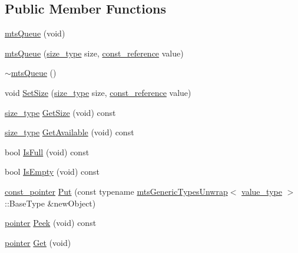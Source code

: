 \subsection*{Public Member Functions}
\begin{DoxyCompactItemize}
\item 
\hyperlink{classmts_queue_ad2d912c1cda4d077291d9b95fc4272e3}{mts\+Queue} (void)
\item 
\hyperlink{classmts_queue_adacea56ce5d53bee10e50c47ade45140}{mts\+Queue} (\hyperlink{classmts_queue_a41b33537b89ae654421ba5e7c9893ed2}{size\+\_\+type} size, \hyperlink{classmts_queue_a3ae67f8b6cdb9686e5fca9ed1740290e}{const\+\_\+reference} value)
\item 
\hyperlink{classmts_queue_a0278e7a778a29113976eb23cb21b8791}{$\sim$mts\+Queue} ()
\item 
void \hyperlink{classmts_queue_ad273e5adfc7842ee91c329d533ebeac6}{Set\+Size} (\hyperlink{classmts_queue_a41b33537b89ae654421ba5e7c9893ed2}{size\+\_\+type} size, \hyperlink{classmts_queue_a3ae67f8b6cdb9686e5fca9ed1740290e}{const\+\_\+reference} value)
\item 
\hyperlink{classmts_queue_a41b33537b89ae654421ba5e7c9893ed2}{size\+\_\+type} \hyperlink{classmts_queue_abac749440695cd9b716928a32de068fd}{Get\+Size} (void) const 
\item 
\hyperlink{classmts_queue_a41b33537b89ae654421ba5e7c9893ed2}{size\+\_\+type} \hyperlink{classmts_queue_aa33751fddc4d9f95d93985feb4322659}{Get\+Available} (void) const 
\item 
bool \hyperlink{classmts_queue_a26f919b9a57cd8f07de077ea9b9b3af5}{Is\+Full} (void) const 
\item 
bool \hyperlink{classmts_queue_a20a006bdb4a95beca2c4dd1104c9bfbf}{Is\+Empty} (void) const 
\item 
\hyperlink{classmts_queue_a1224d9a0146fab27bdb1db050288acb4}{const\+\_\+pointer} \hyperlink{classmts_queue_abb9c17c7303935d91b0be7cd1e790e2f}{Put} (const typename \hyperlink{classmts_generic_types_unwrap}{mts\+Generic\+Types\+Unwrap}$<$ \hyperlink{classmts_queue_a041a2b244150e58247ee55039e0bb00f}{value\+\_\+type} $>$\+::Base\+Type \&new\+Object)
\item 
\hyperlink{classmts_queue_a66d423ede5c12e015a4e070e1bc23f43}{pointer} \hyperlink{classmts_queue_a5c85908b63b0fca770024985458a6951}{Peek} (void) const 
\item 
\hyperlink{classmts_queue_a66d423ede5c12e015a4e070e1bc23f43}{pointer} \hyperlink{classmts_queue_a0fc8b5ffe209a54d13de0e51313341c9}{Get} (void)
\end{DoxyCompactItemize}
